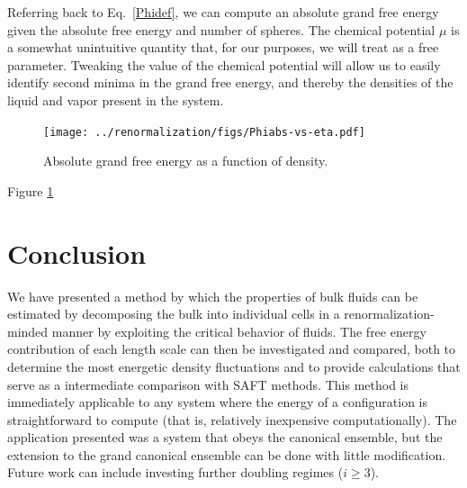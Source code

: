 \documentclass[12pt]{article}
\begin{document}
Referring back to Eq.~\ref{Phidef}, we can compute an absolute grand free energy given the absolute free energy and number of spheres. The chemical potential $\mu$ is a somewhat unintuitive quantity that, for our purposes, we will treat as a free parameter. Tweaking the value of the chemical potential will allow us to easily identify second minima in the grand free energy, and thereby the densities of the liquid and vapor present in the system.
\begin{figure}
\centering
    \texttt{[image: ../renormalization/figs/Phiabs-vs-eta.pdf]}
    \caption{Absolute grand free energy as a function of density.}
    \label{Phi-eta}
\end{figure}
Figure \ref{Phi-eta} 


\section{Conclusion}
We have presented a method by which the properties of bulk fluids can be estimated by decomposing the bulk into individual cells in a renormalization-minded manner by exploiting the critical behavior of fluids. The free energy contribution of each length scale can then be investigated and compared, both to determine the most energetic density fluctuations and to provide calculations that serve as a intermediate comparison with SAFT methods. This method is immediately applicable to any system where the energy of a configuration is straightforward to compute (that is, relatively inexpensive computationally). The application presented was a system that obeys the canonical ensemble, but the extension to the grand canonical ensemble can be done with little modification. Future work can include investing further doubling regimes ($i\geq 3$). 
%
\cleardoublepage

\end{document}
